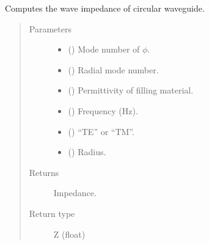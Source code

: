 \documentclass[letterpaper,10pt,english]{sphinxmanual}
\begin{document}

\begin{fulllineitems}
\label{\detokenize{components:components.Z_CWG}}
Computes the wave impedance of circular waveguide.
\begin{quote}\begin{description}
\item[{Parameters}] \leavevmode\begin{itemize}
\item {} 
 () \textendash{} Mode number of \(\phi\).

\item {} 
 () \textendash{} Radial mode number.

\item {} 
 () \textendash{} Permittivity of filling material.

\item {} 
 () \textendash{} Frequency (Hz).

\item {} 
 () \textendash{} “TE” or “TM”.

\item {} 
 () \textendash{} Radius.

\end{itemize}

\item[{Returns}] \leavevmode
Impedance.

\item[{Return type}] \leavevmode
Z (float)

\end{description}\end{quote}

\end{fulllineitems}
\end{document}

